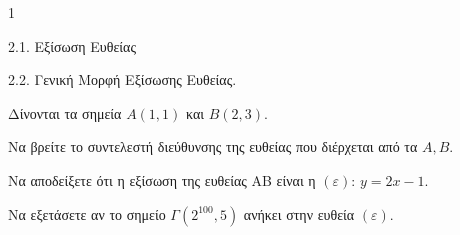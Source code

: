 \begin{ylh}{1}
    \item 2.1. Εξίσωση Ευθείας
    \item 2.2. Γενική Μορφή Εξίσωσης Ευθείας.
\end{ylh}
Δίνονται τα σημεία $A(1,1)$ και $B(2,3)$.
\begin{alist}
\item
    \begin{rlist}
    \item Να βρείτε το συντελεστή διεύθυνσης της ευθείας που διέρχεται από τα $A, B$.
    \item Να αποδείξετε ότι η εξίσωση της ευθείας AB είναι η $(\varepsilon)$: $y=2x-1$.
    \end{rlist} 
\item Να εξετάσετε αν το σημείο $\Gamma(2^{100}, 5)$ ανήκει στην ευθεία $(\varepsilon)$. 
\end{alist}